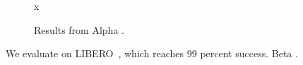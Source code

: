 \documentclass{article}
\newcommand{\libero}{LIBERO~\cite{ka}}
\begin{document}
\begin{figure}\centering x \caption{Results from Alpha \cite{ka}.}\end{figure}
We evaluate on \libero, which reaches 99 percent success.
Beta \cite{kb}.


\end{document}
